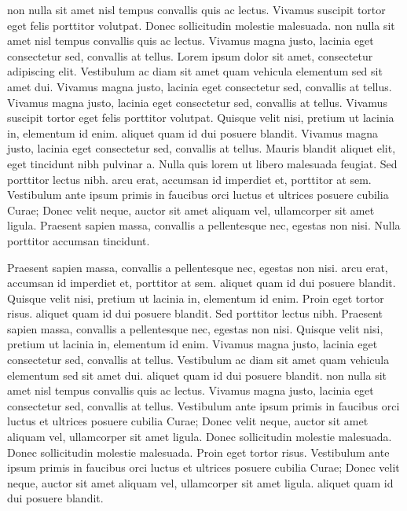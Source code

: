 \documentclass{article}
\begin{document}
 non nulla sit amet nisl tempus convallis quis ac lectus. Vivamus suscipit tortor eget felis porttitor volutpat. Donec sollicitudin molestie malesuada.  non nulla sit amet nisl tempus convallis quis ac lectus. Vivamus magna justo, lacinia eget consectetur sed, convallis at tellus. Lorem ipsum dolor sit amet, consectetur adipiscing elit. Vestibulum ac diam sit amet quam vehicula elementum sed sit amet dui. Vivamus magna justo, lacinia eget consectetur sed, convallis at tellus. Vivamus magna justo, lacinia eget consectetur sed, convallis at tellus. Vivamus suscipit tortor eget felis porttitor volutpat. Quisque velit nisi, pretium ut lacinia in, elementum id enim.  aliquet quam id dui posuere blandit. Vivamus magna justo, lacinia eget consectetur sed, convallis at tellus. Mauris blandit aliquet elit, eget tincidunt nibh pulvinar a. Nulla quis lorem ut libero malesuada feugiat. Sed porttitor lectus nibh.  arcu erat, accumsan id imperdiet et, porttitor at sem. Vestibulum ante ipsum primis in faucibus orci luctus et ultrices posuere cubilia Curae; Donec velit neque, auctor sit amet aliquam vel, ullamcorper sit amet ligula. Praesent sapien massa, convallis a pellentesque nec, egestas non nisi. Nulla porttitor accumsan tincidunt.

Praesent sapien massa, convallis a pellentesque nec, egestas non nisi.  arcu erat, accumsan id imperdiet et, porttitor at sem.  aliquet quam id dui posuere blandit. Quisque velit nisi, pretium ut lacinia in, elementum id enim. Proin eget tortor risus.  aliquet quam id dui posuere blandit. Sed porttitor lectus nibh. Praesent sapien massa, convallis a pellentesque nec, egestas non nisi. Quisque velit nisi, pretium ut lacinia in, elementum id enim. Vivamus magna justo, lacinia eget consectetur sed, convallis at tellus. Vestibulum ac diam sit amet quam vehicula elementum sed sit amet dui.  aliquet quam id dui posuere blandit.  non nulla sit amet nisl tempus convallis quis ac lectus. Vivamus magna justo, lacinia eget consectetur sed, convallis at tellus. Vestibulum ante ipsum primis in faucibus orci luctus et ultrices posuere cubilia Curae; Donec velit neque, auctor sit amet aliquam vel, ullamcorper sit amet ligula. Donec sollicitudin molestie malesuada. Donec sollicitudin molestie malesuada. Proin eget tortor risus. Vestibulum ante ipsum primis in faucibus orci luctus et ultrices posuere cubilia Curae; Donec velit neque, auctor sit amet aliquam vel, ullamcorper sit amet ligula.  aliquet quam id dui posuere blandit.
\end{document}
